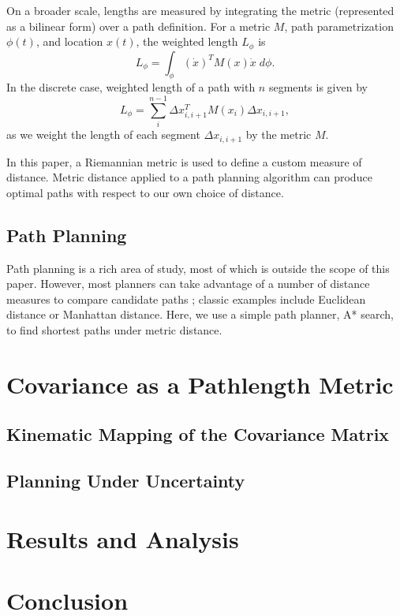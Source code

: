 \documentclass[10pt,conference]{ieeeconf}
\begin{document}
On a broader scale, lengths are measured by integrating the metric (represented as a bilinear form) over a path definition.
For a metric $M$, path parametrization $\phi(t)$, and location $x(t)$, the weighted length $L_\phi$ is
\begin{equation}
    L_\phi = \int_\phi (\dot{x})^T M(x)\dot{x} \; d\phi.
\end{equation}
In the discrete case, weighted length of a path with $n$ segments is given by
\begin{equation}
    L_\phi = \sum_i^{n-1} \Delta x_{i, i+1}^T M(x_i) \Delta x_{i, i+1},
\end{equation}
as we weight the length of each segment $\Delta x_{i,i+1}$ by the metric $M$.

In this paper, a Riemannian metric is used to define a custom measure of distance.
Metric distance applied to a path planning algorithm can produce optimal paths with respect to our own choice of distance.

\subsection{Path Planning}
Path planning is a rich area of study, most of which is outside the scope of this paper.
However, most planners can take advantage of a number of distance measures to compare candidate paths \cite{something?}; classic examples include Euclidean distance or Manhattan distance.
Here, we use a simple path planner, A* search, to find shortest paths under metric distance.


\section{Covariance as a Pathlength Metric}\label{sec:methods}
\subsection{Kinematic Mapping of the Covariance Matrix}
\subsection{Planning Under Uncertainty}

\section{Results and Analysis}\label{sec:analysis}

\section{Conclusion}\label{sec:conclusion}



\end{document}
